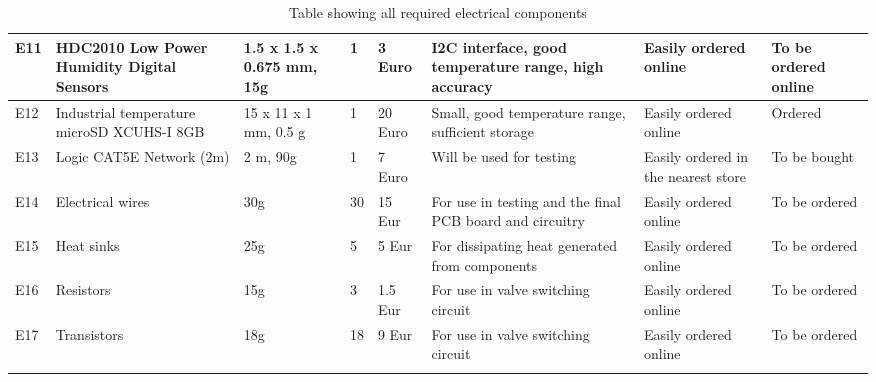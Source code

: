 \begin{longtable}{|m{}|m{}|m{}|m{}|m{}|m{}|m{}|m{}|}
E11 & HDC2010 Low Power Humidity Digital Sensors & 1.5 x 1.5 x 0.675 mm, 15g & 1 & 3 Euro & I2C interface, good temperature range, high accuracy & Easily ordered online & To be ordered online \\ \hline
E12 & Industrial temperature microSD XCUHS-I 8GB & 15 x 11 x 1 mm, 0.5 g & 1 & 20 Euro & Small, good temperature range, sufficient storage & Easily ordered online & Ordered  \\ \hline
E13 & Logic CAT5E Network (2m) & 2 m, 90g & 1 & 7 Euro & Will be used for testing & Easily ordered in the nearest store & To be bought \\ \hline
E14 & Electrical wires & 30g &  30 & 15 Eur & For use in testing and the final PCB board and circuitry & Easily ordered online & To be ordered \\ \hline
E15 & Heat sinks & 25g &  5 &  5 Eur & For dissipating heat generated from components & Easily ordered online & To be ordered \\ \hline
E16 & Resistors & 15g & 3 & 1.5 Eur & For use in valve switching circuit & Easily ordered online & To be ordered \\ \hline
E17 & Transistors & 18g & 18 & 9 Eur &  For use in valve switching circuit & Easily ordered online & To be ordered \\ \hline 


    \caption{Table showing all required electrical components}
    \label{tab:electrical-components}
\end{longtable}
\raggedbottom